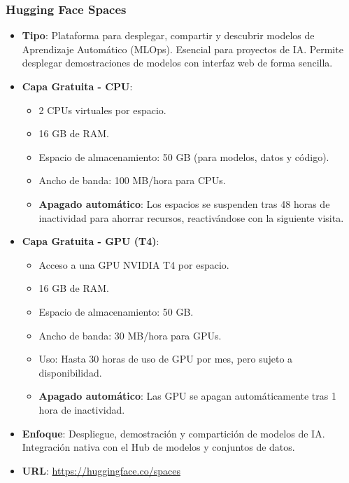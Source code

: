 \subsubsection*{Hugging Face Spaces}
\begin{itemize}
	\item \textbf{Tipo}: Plataforma para desplegar, compartir y descubrir modelos de Aprendizaje Automático (MLOps). Esencial para proyectos de IA. Permite desplegar demostraciones de modelos con interfaz web de forma sencilla.
	\item \textbf{Capa Gratuita - CPU}: 
	\begin{itemize}
		\item 2 CPUs virtuales por espacio.
		\item 16 GB de RAM.
		\item Espacio de almacenamiento: 50 GB (para modelos, datos y código).
		\item Ancho de banda: 100 MB/hora para CPUs.
		\item \textbf{Apagado automático}: Los espacios se suspenden tras 48 horas de inactividad para ahorrar recursos, reactivándose con la siguiente visita.
	\end{itemize}
	\item \textbf{Capa Gratuita - GPU (T4)}: 
	\begin{itemize}
		\item Acceso a una GPU NVIDIA T4 por espacio.
		\item 16 GB de RAM.
		\item Espacio de almacenamiento: 50 GB.
		\item Ancho de banda: 30 MB/hora para GPUs.
		\item Uso: Hasta 30 horas de uso de GPU por mes, pero sujeto a disponibilidad.
		\item \textbf{Apagado automático}: Las GPU se apagan automáticamente tras 1 hora de inactividad.
	\end{itemize}
	\item \textbf{Enfoque}: Despliegue, demostración y compartición de modelos de IA. Integración nativa con el Hub de modelos y conjuntos de datos.
	\item \textbf{URL}: \url{https://huggingface.co/spaces}
\end{itemize}

